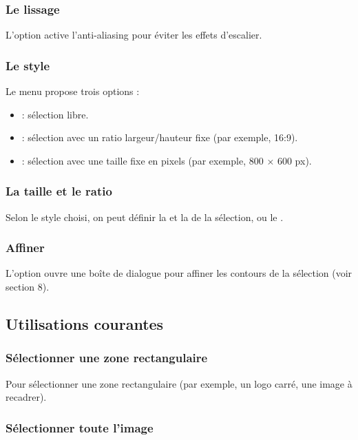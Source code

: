 \subsubsection{Le lissage}

L'option  active l'anti-aliasing pour éviter les effets d'escalier.

\subsubsection{Le style}

Le menu  propose trois options :

\begin{itemize}
    \item {} : sélection libre.
    \item {} : sélection avec un ratio largeur/hauteur fixe (par exemple, 16:9).
    \item {} : sélection avec une taille fixe en pixels (par exemple, 800 × 600 px).
\end{itemize}

\subsubsection{La taille et le ratio}

Selon le style choisi, on peut définir la  et la  de la sélection, ou le .

\subsubsection{Affiner}

L'option  ouvre une boîte de dialogue pour affiner les contours de la sélection (voir section 8).

\subsection{Utilisations courantes}

\subsubsection{Sélectionner une zone rectangulaire}

Pour sélectionner une zone rectangulaire (par exemple, un logo carré, une image à recadrer).

\subsubsection{Sélectionner toute l'image}


